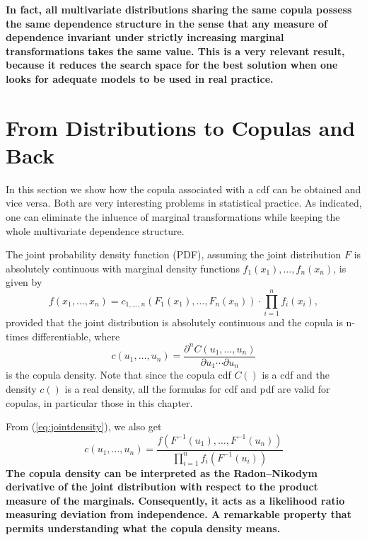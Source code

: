 \textbf{In fact, all multivariate distributions sharing the same copula possess the same dependence
structure in the sense that any measure of dependence invariant under strictly
increasing marginal transformations takes the same value. This is a very relevant result, because it reduces the search space for the best solution when one looks for adequate models to be used in real practice.}

\section{From Distributions to Copulas and Back}\label{subsec:conversion}
In this section we show how the copula associated with a cdf can be obtained and vice versa. Both are very interesting problems in statistical practice. As indicated, one can eliminate the inluence of marginal transformations while keeping the whole multivariate dependence structure.

The joint probability density function (PDF), assuming the joint distribution $F$ is absolutely continuous with marginal density functions $f_1(x_1),\ldots, f_n(x_n)$, is given by
\begin{equation}
\boxed{
f(x_1,\ldots, x_n)
= c_{1,\ldots,n}(F_1(x_1),\ldots,F_n(x_n)) \cdot \prod_{i=1}^n f_i(x_i),
\label{eq:jointdensity}
}
\end{equation}
provided that the joint distribution is absolutely continuous and the copula is
n-times differentiable,
where
\begin{equation}
\boxed{c(u_1,\ldots,u_n)
= \frac{\partial^n C(u_1,\ldots,u_n)}{\partial u_1 \cdots \partial u_n}
}
\end{equation}
is the copula density. Note that since the copula cdf $C()$ is a cdf and the density $c()$ is a real density, all the formulas for cdf and pdf are valid for copulas, in particular those in this chapter.

From (\ref{eq:jointdensity}), we also get
\begin{equation}
\boxed{
 c(u_1,\ldots,u_n)
= \frac{f(F^{-1}(u_1),\ldots, F^{-1}(u_n))}{\prod_{i=1}^n f_i(F^{-1}(u_i))}
}
\label{eq:copuladensity}
\end{equation}
\textbf{The copula density can be interpreted as the Radon–Nikodym derivative of the joint
distribution with respect to the product measure of the marginals. Consequently, it
acts as a likelihood ratio measuring deviation from independence. A remarkable property that permits understanding what the copula density means.}

